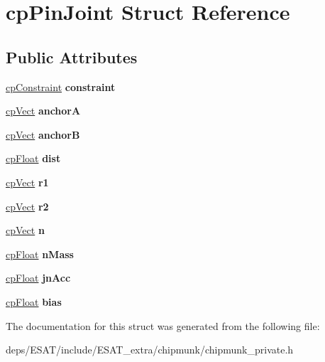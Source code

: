\hypertarget{structcp_pin_joint}{}\section{cp\+Pin\+Joint Struct Reference}
\label{structcp_pin_joint}
\subsection*{Public Attributes}
\begin{DoxyCompactItemize}
\item 
\mbox{\label{structcp_pin_joint_a22271b24382dc0f3c3252b920f5ea2b0}} 
\mbox{\hyperlink{structcp_constraint}{cp\+Constraint}} {\bfseries constraint}
\item 
\mbox{\label{structcp_pin_joint_a8323f431e3a4ff0d9267ed909dada92f}} 
\mbox{\hyperlink{structcp_vect}{cp\+Vect}} {\bfseries anchorA}
\item 
\mbox{\label{structcp_pin_joint_a11e90db9a11f6dd63d49639f87ff93cd}} 
\mbox{\hyperlink{structcp_vect}{cp\+Vect}} {\bfseries anchorB}
\item 
\mbox{\label{structcp_pin_joint_a045d7f0e20e7cb35121063026712cdf0}} 
\mbox{\hyperlink{group__basic_types_gac1ed65573e035bf892505768c852d8d3}{cp\+Float}} {\bfseries dist}
\item 
\mbox{\label{structcp_pin_joint_a5cd074b422532afc76c1d2b47e755543}} 
\mbox{\hyperlink{structcp_vect}{cp\+Vect}} {\bfseries r1}
\item 
\mbox{\label{structcp_pin_joint_a82dbd85f7f012228dd51c1c6b9b5b661}} 
\mbox{\hyperlink{structcp_vect}{cp\+Vect}} {\bfseries r2}
\item 
\mbox{\label{structcp_pin_joint_a7bc2a4109fa4ec19e857bc7eff57701a}} 
\mbox{\hyperlink{structcp_vect}{cp\+Vect}} {\bfseries n}
\item 
\mbox{\label{structcp_pin_joint_a6e13d4ba204e4421d1264737913d68c4}} 
\mbox{\hyperlink{group__basic_types_gac1ed65573e035bf892505768c852d8d3}{cp\+Float}} {\bfseries n\+Mass}
\item 
\mbox{\label{structcp_pin_joint_abbb714ec340b9fc5e7d9fbd9530b8f46}} 
\mbox{\hyperlink{group__basic_types_gac1ed65573e035bf892505768c852d8d3}{cp\+Float}} {\bfseries jn\+Acc}
\item 
\mbox{\label{structcp_pin_joint_a3344a217c5313f65db0b4fb773d7ea11}} 
\mbox{\hyperlink{group__basic_types_gac1ed65573e035bf892505768c852d8d3}{cp\+Float}} {\bfseries bias}
\end{DoxyCompactItemize}


The documentation for this struct was generated from the following file\+:\begin{DoxyCompactItemize}
\item 
deps/\+E\+S\+A\+T/include/\+E\+S\+A\+T\+\_\+extra/chipmunk/chipmunk\+\_\+private.\+h\end{DoxyCompactItemize}
